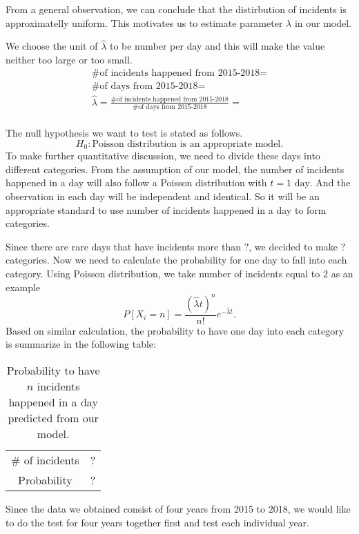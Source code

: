 \documentclass[11pt,a4paper,english]{article}
\begin{document}
From a general observation, we can conclude that the distirbution of incidents is approximatelly uniform. This motivates us to estimate parameter $\lambda$ in our model.

We choose the unit of $\hat{\lambda}$ to be number per day and this will make the value neither too large or too small.
\[
    \begin{aligned}
        \text{\# of incidents happened from 2015-2018} = \\
        \text{\# of days from 2015-2018} = \\
        \hat{\lambda} = \frac{\text{\# of incidents happened from 2015-2018}}{\text{\# of days from 2015-2018}} = \\
    \end{aligned}
\]

The null hypothesis we want to test is stated as follows.
\[H_{0}:\text{Poisson distribution is an appropriate model.}\]
To make further quantitative discussion, we need to divide these days into different categories. 
From the assumption of our model, the number of incidents happened in a day will also follow a Poisson distribution with $t = 1\text{ day}$. 
And the observation in each day will be independent and identical. 
So it will be an appropriate standard to use number of incidents happened in a day to form categories. 

Since there are rare days that have incidents more than $?$, we decided to make $?$ categories. Now we need to calculate the probability for one day to fall into each category. Using Poisson distribution, we take number of incidents equal to $2$ as an example
\[P[X_{i} = n] = \frac{(\hat{\lambda}t)^{n}}{n!}e^{-\hat{\lambda} t}.\]
Based on similar calculation, the probability to have one day into each category is summarize in the following table:
\begin{table}[htbp]
    \centering
    \caption{Probability to have $n$ incidents happened in a day predicted from our model.}
    \begin{tabular}{cc}
        \# of incidents & ?\\
        Probability & ?\\
    \end{tabular}
\end{table}

Since the data we obtained consist of four years from 2015 to 2018, we would like to do the test for four years together first and test each individual year. 
\end{document}
